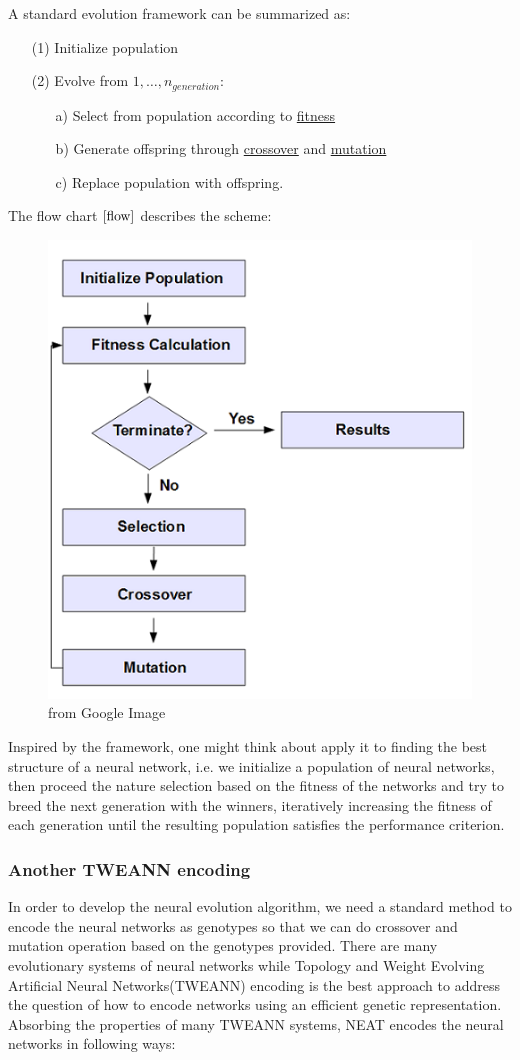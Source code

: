 \documentclass{article}
\begin{document}
A standard evolution framework can be summarized as:
\begin{itemize}
  \item[(1)] Initialize population
  \item[(2)] Evolve from $1, \ldots, n_{generation}$:
  \begin{itemize} 
  \item[a)] Select from population according to \underline{fitness}
  \item[b)] Generate offspring through \underline{crossover} and \underline{mutation}
  \item[c)] Replace population with offspring. 
  \end{itemize}
\end{itemize}
The flow chart $\ref{flow}$ describes the scheme:
\begin{figure}[htbp]
  \centering
  \includegraphics[width = .6\textwidth]{genetic}
  \caption{from Google Image}
  \label{flow}
\end{figure}
Inspired by the framework, one might think about apply it to finding the best structure of a neural network, i.e. we initialize a population
of neural networks, then proceed the nature selection based on the fitness of the networks and try to breed the next generation with the winners,
iteratively increasing the fitness of each generation until the resulting population satisfies the performance criterion. 


\subsubsection{Another TWEANN encoding}

In order to develop the neural evolution algorithm, we need a standard method to encode the neural networks as genotypes so that we can
do crossover and mutation operation based on the genotypes provided. There are many evolutionary systems of neural networks while Topology and Weight Evolving Artificial Neural Networks(TWEANN)
encoding is the best approach to address the question of how to encode networks using an efficient genetic representation. Absorbing the properties of
many TWEANN systems, NEAT encodes the neural networks in following ways:
\end{document}
